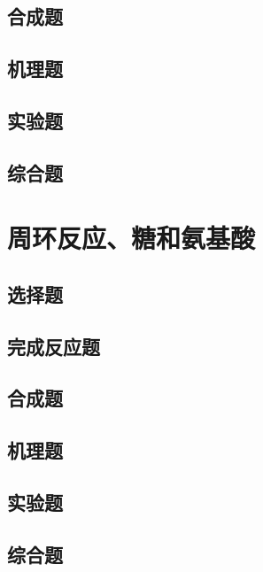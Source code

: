 \documentclass[
  10pt,
  twoside,
  openany,
  b5paper, %
  colorscheme = basic, %
]{qyxf-book}
\begin{document}
\section{合成题}
\section{机理题}
\section{实验题}
\section{综合题}

\chapter{周环反应、糖和氨基酸}

\section{选择题}
\section{完成反应题}
\section{合成题}
\section{机理题}
\section{实验题}
\section{综合题}
\end{document}
